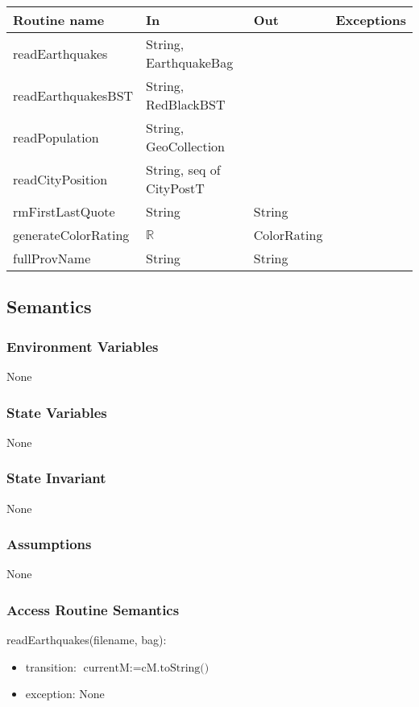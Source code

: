 \documentclass[12pt]{article}
\begin{document}
\begin{tabular}{| l | l | l | l |}
\hline
\textbf{Routine name} & \textbf{In} & \textbf{Out} & \textbf{Exceptions}\\
\hline
readEarthquakes & String, EarthquakeBag & ~ & ~\\
\hline
readEarthquakesBST & String, RedBlackBST & ~ & ~\\
\hline
readPopulation & String, GeoCollection & ~ & ~\\
\hline
readCityPosition & String, seq of CityPostT & ~ & ~\\
\hline
rmFirstLastQuote & String & String & ~\\
\hline
generateColorRating & $\mathbb{R}$ & ColorRating & ~\\
\hline
fullProvName & String & String & ~\\
\hline
\end{tabular}

\subsection* {Semantics}

\subsubsection* {Environment Variables}

None

\subsubsection* {State Variables}

None

\subsubsection* {State Invariant}

None

\subsubsection* {Assumptions}

None

\subsubsection* {Access Routine Semantics}

\noindent readEarthquakes(filename, bag):
\begin{itemize}
\item transition: $\mbox{currentM} := \mbox{cM.toString()}$
\item exception: None
\end{itemize}
\end{document}
